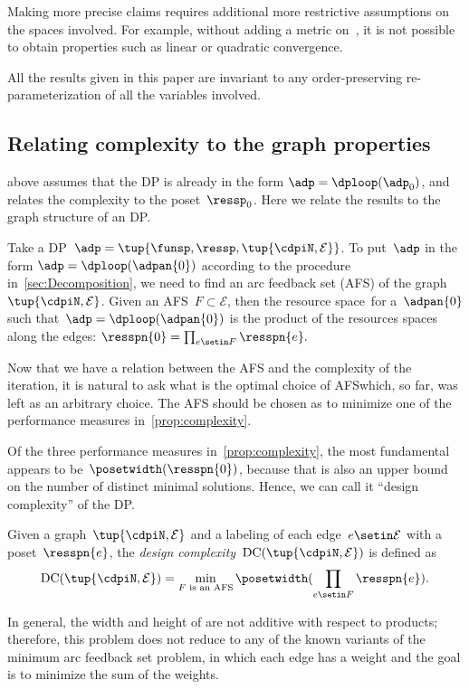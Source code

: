 \begin{remark}
    Making more precise claims requires additional more restrictive assumptions on the spaces involved.
    For example, without adding a metric on~\ressp, it is not possible to obtain properties such as linear or quadratic convergence.
\end{remark}

\begin{remark}
    All the results given in this paper are invariant to any order-preserving re-parameterization of all the variables involved.
\end{remark}

\subsection{Relating complexity to the graph properties}

 above assumes that the DP is already in the form $\adp=\dploop(\adp_{0})$, and relates the complexity to the poset~$\ressp_{0}$.
Here we relate the results to the graph structure of an DP.

Take a DP~$\adp=\tup{ \funsp,\ressp,\tup{ \cdpiN,\mathcal{E}} } $.
To put~$\adp$ in the form $\adp=\dploop(\adpan{0})$ according to the procedure in~\cref{sec:Decomposition}, we need to find an arc feedback set (AFS) of the graph~$\tup{ \cdpiN,\mathcal{E}} $.
Given an AFS~$F\subset\mathcal{E}$, then the resource space~\ressp for a~$\adpan{0}$ such that~$\adp=\dploop(\adpan{0})$ is the product of the resources spaces along the edges: $\resspn{0}=\prod_{e\setin F}\resspn{e}.
$

Now that we have a relation between the AFS and the complexity of the iteration, it is natural to ask what is the optimal choice of AFS\textemdash which, so far, was left as an arbitrary choice.
The AFS should be chosen as to minimize one of the performance measures in~\cref{prop:complexity}.

Of the three performance measures in~\cref{prop:complexity}, the most fundamental appears to be~$\posetwidth(\resspn{0})$, because that is also an upper bound on the number of distinct minimal solutions.
Hence, we can call it ``design complexity'' of the DP.
\begin{definition}
    \label{def:design-complexity}
    Given a graph~$\tup{ \cdpiN,\mathcal{E}}$ and a labeling of each edge~$e\setin\mathcal{E}$ with a poset~$\resspn{e}$, the \emph{design complexity}~$\text{DC}(\tup{ \cdpiN,\mathcal{E}} )$ is defined as
    \begin{equation}
        \text{DC}(\tup{ \cdpiN,\mathcal{E}} )=\min_{F\text{ is an AFS}}\posetwidth(\prod_{e\setin F}\resspn{e}).
        \label{eq:complexity}
    \end{equation}
\end{definition}
In general, the width and height of  are not additive with respect to products; therefore, this problem does not reduce to any of the known variants of the minimum arc feedback set problem, in which each edge has a weight and the goal is to minimize the sum of the weights.

